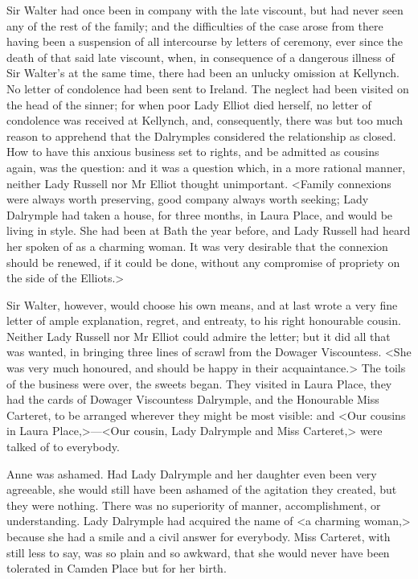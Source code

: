 Sir Walter had once been in company with the late viscount, but had never seen any of the rest of the family; and the difficulties of the case arose from there having been a suspension of all intercourse by letters of ceremony, ever since the death of that said late viscount, when, in consequence of a dangerous illness of Sir Walter's at the same time, there had been an unlucky omission at Kellynch. No letter of condolence had been sent to Ireland. The neglect had been visited on the head of the sinner; for when poor Lady Elliot died herself, no letter of condolence was received at Kellynch, and, consequently, there was but too much reason to apprehend that the Dalrymples considered the relationship as closed. How to have this anxious business set to rights, and be admitted as cousins again, was the question: and it was a question which, in a more rational manner, neither Lady Russell nor Mr Elliot thought unimportant. <Family connexions were always worth preserving, good company always worth seeking; Lady Dalrymple had taken a house, for three months, in Laura Place, and would be living in style. She had been at Bath the year before, and Lady Russell had heard her spoken of as a charming woman. It was very desirable that the connexion should be renewed, if it could be done, without any compromise of propriety on the side of the Elliots.>

Sir Walter, however, would choose his own means, and at last wrote a very fine letter of ample explanation, regret, and entreaty, to his right honourable cousin. Neither Lady Russell nor Mr Elliot could admire the letter; but it did all that was wanted, in bringing three lines of scrawl from the Dowager Viscountess. <She was very much honoured, and should be happy in their acquaintance.> The toils of the business were over, the sweets began. They visited in Laura Place, they had the cards of Dowager Viscountess Dalrymple, and the Honourable Miss Carteret, to be arranged wherever they might be most visible: and <Our cousins in Laura Place,>—<Our cousin, Lady Dalrymple and Miss Carteret,> were talked of to everybody.

Anne was ashamed. Had Lady Dalrymple and her daughter even been very agreeable, she would still have been ashamed of the agitation they created, but they were nothing. There was no superiority of manner, accomplishment, or understanding. Lady Dalrymple had acquired the name of <a charming woman,> because she had a smile and a civil answer for everybody. Miss Carteret, with still less to say, was so plain and so awkward, that she would never have been tolerated in Camden Place but for her birth.

